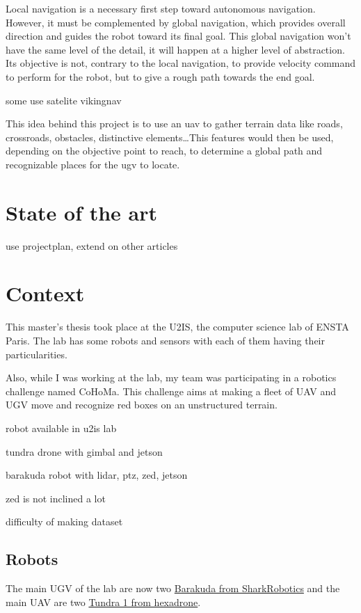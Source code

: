 Local navigation is a necessary first step toward autonomous navigation.
However, it must be complemented by global navigation, which provides overall direction and guides the robot toward its final goal.
This global navigation won't have the same level of the detail, it will happen at a higher level of abstraction.
Its objective is not, contrary to the local navigation, to provide velocity command to perform for the robot, but
to give a rough path towards the end goal.


some use satelite vikingnav


This idea behind this project is to use an \gls{uav} to gather terrain data like roads, crossroads, obstacles, distinctive
elements\ldots This features would then be used, depending on the objective point to reach, to determine a global
path and recognizable places for the \gls{ugv} to locate.


\section{State of the art}\label{sec:state-of-the-art}

use projectplan, extend on other articles


\section{Context}\label{sec:context}

This master's thesis took place at the U2IS, the computer science lab of ENSTA Paris.
The lab has some robots and sensors with each of them having their particularities.

Also, while I was working at the lab, my team was participating in a robotics challenge named CoHoMa.
This challenge aims at making a fleet of UAV and UGV move and recognize red boxes on an unstructured terrain.


robot available in u2is lab

tundra drone with gimbal and jetson

barakuda robot with lidar, ptz, zed, jetson

zed is not inclined a lot

difficulty of making dataset

\subsection{Robots}

The main UGV of the lab are now two \href{https://www.shark-robotics.com/robots/barakuda-mule-robot}{Barakuda from SharkRobotics}
and the main UAV are two \href{https://www.hexadrone.fr/produits/drone-tundra/}{Tundra 1 from hexadrone}.

